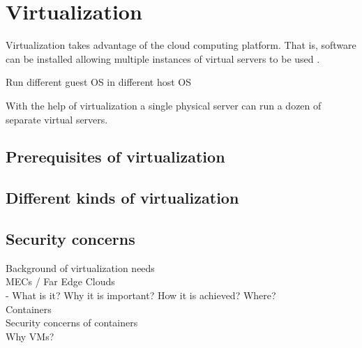 \section{Virtualization}

Virtualization takes advantage of the cloud computing platform. That is, software can be installed allowing multiple instances of virtual servers to be used \cite{Velte2009}.

Run different guest OS in different host OS

With the help of virtualization a single physical server can run a dozen of separate virtual servers.

\subsection{Prerequisites of virtualization}

\subsection{Different kinds of virtualization}

\subsection{Security concerns}



Background of virtualization needs \\
MECs / Far Edge Clouds \\
    - What is it? Why it is important? How it is achieved? Where? \\
Containers \\
Security concerns of containers \\
Why VMs? \\



